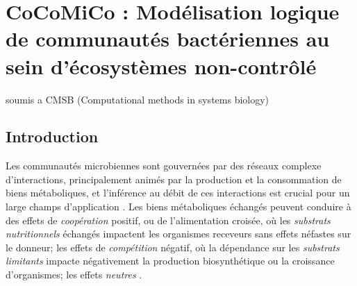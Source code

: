 %   	

\chapter{CoCoMiCo : Modélisation logique de communautés bactériennes au sein d'écosystèmes non-contrôlé}
\minitoc
soumis a CMSB (Computational methods in systems biology) 
\newpage

\section{Introduction}

Les communautés microbiennes sont gouvernées par des réseaux complexe d'interactions, principalement animés par la production et la consommation de biens métaboliques, et l'inférence au débit de ces interactions est crucial pour un large champs d'application \citep{Wilmes.2022,Fournier.2022,Rousk2016,Cao2021}. Les biens métaboliques échangés  peuvent conduire à des effets de \emph{coopération} positif, ou de l'alimentation croisée, où les \emph{substrats nutritionnels} échangés impactent les organismes receveurs sans effets néfastes sur le donneur; les effets de \emph{compétition} négatif, où la dépendance sur les \emph{substrats limitants} impacte négativement la production biosynthétique ou la croissance d'organismes; les effets \emph{neutres} \citep{Faust2012}.\\

